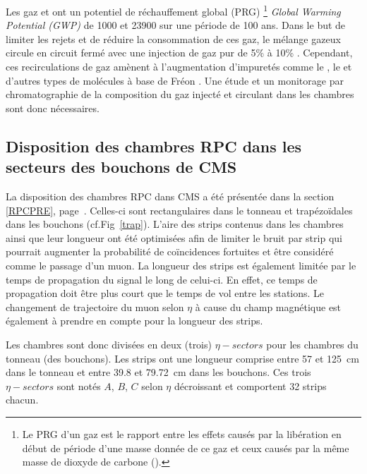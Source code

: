 Les gaz  et  ont un  potentiel de réchauffement global (PRG) \footnote{Le PRG d’un gaz est le rapport entre les effets causés par la libération en début de période d’une masse donnée de ce gaz et ceux causés par la même masse de dioxyde de carbone ().} \textit{Global Warming Potential (GWP)} de \num{1000} et \num{23900} sur une période de \num{100} ans. Dans le but de limiter les rejets et de réduire la consommation de ces gaz, le mélange gazeux circule en circuit fermé avec une injection de gaz pur de \num{5}\% à \num{10}\% \cite{5401780}. Cependant, ces recirculations de gaz amènent à l'augmentation d'impuretés comme le , le  et d'autres types de molécules à base de Fréon \cite{1748-0221-8-08-T08003}. Une étude et un monitorage par chromatographie de la composition du gaz injecté et circulant dans les chambres sont donc nécessaires. 

\subsection{Disposition des chambres RPC dans les secteurs des bouchons de CMS}
\vspace{-0.2cm}
La disposition des chambres RPC dans CMS a été présentée dans la section \ref{RPCPRE}, page~\pageref{RPCPRE}. Celles-ci sont rectangulaires dans le tonneau et trapézoïdales dans les bouchons (cf.Fig~\ref{trap}). L'aire des strips contenus dans les chambres ainsi que leur longueur ont été optimisées afin de limiter le bruit par strip qui pourrait augmenter la probabilité de coïncidences fortuites et être considéré comme le passage d'un muon. La longueur des strips est également limitée par le temps de propagation du signal le long de celui-ci. En effet, ce temps de propagation doit être plus court que le temps de vol entre les stations. Le changement de trajectoire du muon selon $\eta$ à cause du champ magnétique est également à prendre en compte pour la longueur des strips.

Les chambres sont donc divisées en deux (trois) $\eta-sectors$ pour les chambres du tonneau (des bouchons). Les strips ont une longueur comprise entre \num{57} et \SI{125}{\centi\meter} dans le tonneau et entre \num{39.8} et \SI{79.72}{\centi\meter} dans les bouchons. Ces trois $\eta-sectors$ sont notés $A$, $B$, $C$ selon $\eta$ décroissant et comportent \num{32} strips chacun.

